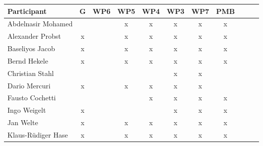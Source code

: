 \documentclass[a4paper, 11pt]{article}
\begin{document}
\begin{tabular}{|l|c|c|c|c||c|c|c||c|c|c|}
\hline
\textbf{Participant}  & \textbf{G} & \textbf{WP6} &  \textbf{WP5} & \textbf{WP4}&  \textbf{WP3} & \textbf{WP7}&  \textbf{PMB} \\\hline
Abdelnasir Mohamed    &  &   & x & x  & x & x & x \\\hline 
Alexander Probst      & x &   & x & x & x & x & x  \\\hline  
Baseliyos Jacob       & x &   & x & x & x & x & x \\\hline 
Bernd Hekele          & x &   & x & x & x & x & x \\\hline
Christian Stahl      &   &   &  &  & x & x  &   \\\hline
Dario Mercuri        & x &   & x & x & x & x &   \\\hline
Fausto Cochetti      &   &   &   & x & x & x & x \\\hline
Ingo Weigelt         & x  &   &  &  & x & x &  x \\\hline
Jan Welte            & x &   & x & x & x & x & x  \\\hline
Klaus-R\"udiger Hase & x &   & x & x & x & x & x \\\hline

\end{tabular}
\end{document}
